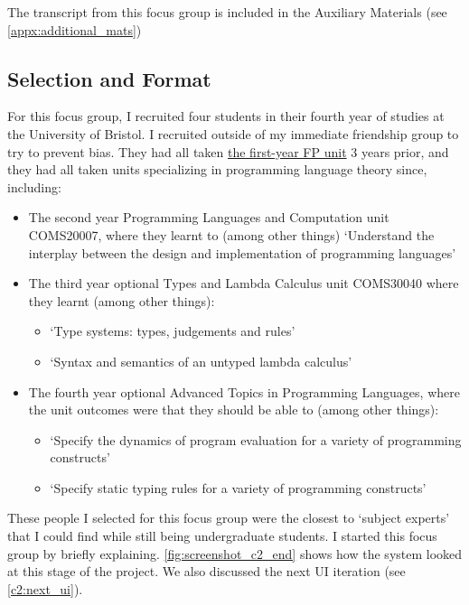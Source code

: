The transcript from this focus group is included in the Auxiliary Materials (see \ref{appx:additional_mats})

\subsection{Selection and Format}
For this focus group, I recruited four students in their fourth year of studies at the University of Bristol. I recruited outside of my immediate friendship group to try to prevent bias. They had all taken \hyperref[COMS10016]{the first-year FP unit} 3 years prior, and they had all taken units specializing in programming language theory since, including:

\begin{itemize}
    \item The second year Programming Languages and Computation unit COMS20007, where they learnt to (among other things) `Understand the interplay between the design and implementation of programming languages' \cite{COMS20007_PLC}
    \item The third year optional Types and Lambda Calculus unit COMS30040 where they learnt (among other things): \cite{COMS30040_TLC} 
    \begin{itemize}
        \item `Type systems: types, judgements and rules'
        \item `Syntax and semantics of an untyped lambda calculus'
    \end{itemize}
    \item The fourth year optional Advanced Topics in Programming Languages, where the unit outcomes were that they should be able to (among other things): \cite{COMSM0067_ATPL}
    \begin{itemize}
        \item `Specify the dynamics of program evaluation for a variety of programming constructs'
        \item `Specify static typing rules for a variety of programming constructs'
    \end{itemize}
\end{itemize}

These people I selected for this focus group were the closest to `subject experts' that I could find while still being undergraduate students. 
I started this focus group by briefly explaining. \ref{fig:screenshot_c2_end} shows how the system looked at this stage of the project. We also discussed the next UI iteration (see \ref{c2:next_ui}). 

